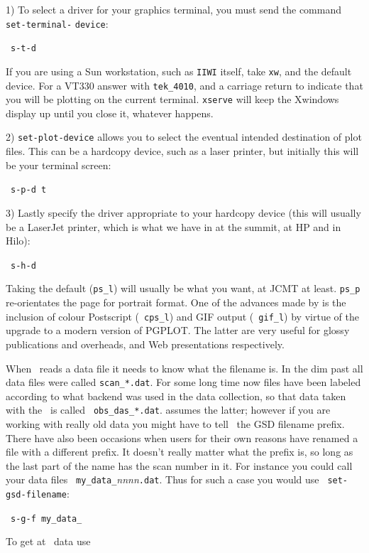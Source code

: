 1) To select a driver for your graphics terminal, you must send the command 
{\tt set-terminal-} {\tt device}:

\SP\  {\tt s-t-d} 

If you are using a Sun workstation, such as {\tt IIWI} itself, take
{\tt xw}, and the default device. For a VT330 answer with
{\tt tek\_4010}, and a carriage return to indicate that you will be
plotting on the current terminal. {\tt xserve} will keep the Xwindows
display up until you close it, whatever happens.

2) {\tt set-plot-device} allows you to select the eventual intended
destination of plot files.  This can be a hardcopy device, such as a
laser printer, but initially this will be your terminal screen:

\SP\  {\tt s-p-d  t} 

3) Lastly specify the driver appropriate to your hardcopy device (this
will usually be a LaserJet printer, which is what we have in at the
summit, at HP and in Hilo):

\SP\  {\tt s-h-d} 

Taking the default ({\tt{ps\_l}}) will usually be what you want, at JCMT at
least. {\tt ps\_p} re-orientates the page for portrait format.  One of the
advances made by  is the inclusion of colour Postscript
(\eg\ {\tt cps\_l}) and GIF output (\eg\ {\tt gif\_l}) by virtue of the
upgrade to a modern version of PGPLOT. The latter are very useful for
glossy publications and overheads, and Web presentations respectively. 

\aside

When \SPECX\ reads a data file it needs to know what the filename is.  In
the dim past all data files were called {\tt scan\_*.dat}.  For some long
time now files have been labeled according to what backend was used in the
data collection, so that data taken with the \das\ is called {\tt
obs\_das\_*.dat}.  assumes the latter; however if you are
working with really old data you might have to tell \SPECX\ the GSD
filename prefix. There have also been occasions when users for their own
reasons have renamed a file with a different prefix. It doesn't really
matter what the prefix is, so long as the last part of the name has the
scan number in it. For instance you could call your data files {\tt
my\_data\_}{\it nnnn}{\tt .dat}. Thus for such a case you would use {\tt
set-gsd-filename}: 

\SP\ {\tt s-g-f my\_data\_}

To get at \aosc\ data use

